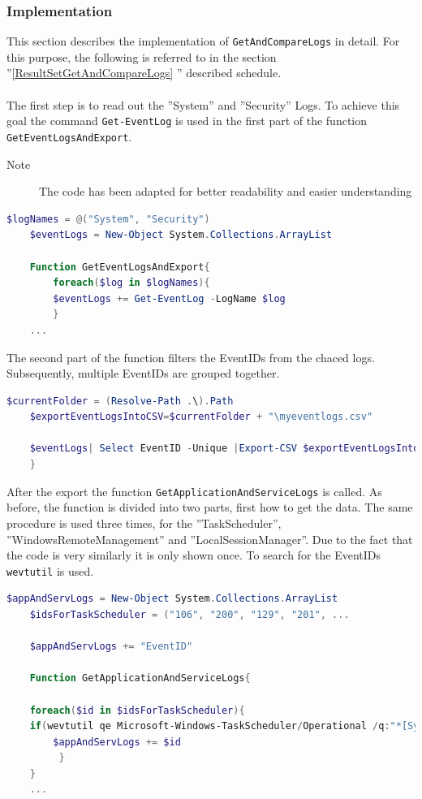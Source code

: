 \subsubsection{Implementation}
This section describes the implementation of \lstinline|GetAndCompareLogs| in detail. For this purpose, the following is referred to in the section ''\ref{ResultSetGetAndCompareLogs} '' described schedule.
\\\\
The first step is to read out the ''System'' and ''Security'' Logs. To achieve this goal the command \lstinline|Get-EventLog| is used in the first part of the function \lstinline|GetEventLogsAndExport|. \begin{description}
    \item[Note] The code has been adapted for better readability and easier understanding
    \end{description}
\begin{lstlisting}[caption=Function GetEventLogsAndExport Part 1, language=PowerShell]
    $logNames = @("System", "Security")
    $eventLogs = New-Object System.Collections.ArrayList

    Function GetEventLogsAndExport{
        foreach($log in $logNames){
        $eventLogs += Get-EventLog -LogName $log
        }
    ...
\end{lstlisting}
The second part of the function filters the EventIDs from the chaced logs. Subsequently, multiple EventIDs are grouped together.
\begin{lstlisting}[caption=Function GetEventLogsAndExport Part 2, language=PowerShell]
    $currentFolder = (Resolve-Path .\).Path
    $exportEventLogsIntoCSV=$currentFolder + "\myeventlogs.csv"

    $eventLogs| Select EventID -Unique |Export-CSV $exportEventLogsIntoCSV -NoTypeInfo -Encoding UTF8
    }
\end{lstlisting}
After the export the function \lstinline|GetApplicationAndServiceLogs| is called. As before, the function is divided into two parts, first how to get the data. The same procedure is used three times, for the ''TaskScheduler'', ''WindowsRemoteManagement'' and ''LocalSessionManager''. Due to the fact that the code is very similarly it is only shown once. To search for the EventIDs  \lstinline|wevtutil| is used.
\begin{lstlisting}[caption=Function GetApplicationAndServiceLogs Part 1, language=PowerShell]
    $appAndServLogs = New-Object System.Collections.ArrayList
    $idsForTaskScheduler = ("106", "200", "129", "201", ...

    $appAndServLogs += "EventID"

    Function GetApplicationAndServiceLogs{
    
    foreach($id in $idsForTaskScheduler){
    if(wevtutil qe Microsoft-Windows-TaskScheduler/Operational /q:"*[System[(EventID="$id" )]]" /uni:false /f:text){
        $appAndServLogs += $id
         }
    }
    ...
\end{lstlisting}

